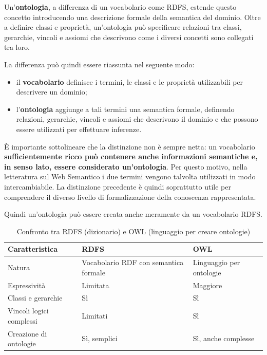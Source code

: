 Un'\textbf{ontologia}, a differenza di un vocabolario come RDFS, estende questo concetto introducendo una
descrizione formale della semantica del dominio. Oltre a definire classi e
proprietà, un'ontologia può specificare relazioni tra classi, gerarchie,
vincoli e assiomi che descrivono come i diversi concetti sono collegati tra
loro.


La differenza può quindi essere riassunta nel seguente modo:

\begin{itemize}
    \item il \textbf{vocabolario} definisce i termini, le classi e le
    proprietà utilizzabili per descrivere un dominio;
    \item l'\textbf{ontologia} aggiunge a tali termini una semantica
    formale, definendo relazioni, gerarchie, vincoli e assiomi che
    descrivono il dominio e che possono essere utilizzati per effettuare
    inferenze.
\end{itemize}

È importante sottolineare che la distinzione non è sempre netta: un
vocabolario \textbf{sufficientemente ricco può contenere anche informazioni
semantiche e, in senso lato, essere considerato un'ontologia}. Per questo
motivo, nella letteratura sul Web Semantico i due termini vengono talvolta
utilizzati in modo intercambiabile. La distinzione precedente è quindi
soprattutto utile per comprendere il diverso livello di formalizzazione
della conoscenza rappresentata.


Quindi un'ontologia può essere creata anche meramente da un vocabolario RDFS.


\begin{table}[h!]
    \centering
    \renewcommand{\arraystretch}{1.4}
    \begin{tabular}{|l|p{5cm}|p{5cm}|}
        \hline
        \textbf{Caratteristica} & \textbf{RDFS} & \textbf{OWL} \\
        \hline
        Natura & Vocabolario RDF con semantica formale & Linguaggio per ontologie \\
        \hline
        Espressività & Limitata & Maggiore \\
        \hline
        Classi e gerarchie & Sì & Sì \\
        \hline
        Vincoli logici complessi & Limitati & Sì \\
        \hline
        Creazione di ontologie & Sì, semplici & Sì, anche complesse \\
        \hline
    \end{tabular}
    \caption{Confronto tra RDFS (dizionario) e OWL (linguaggio per creare ontologie)}
    \label{tab:rdfs-owl}
\end{table}

